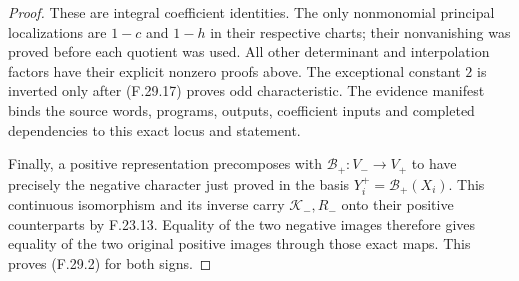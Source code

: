 \begin{proof}
These are integral coefficient identities.
The only nonmonomial principal localizations
are $1-c$ and $1-h$ in their respective
charts; their nonvanishing was proved before
each quotient was used. All other determinant
and interpolation factors have their explicit
nonzero proofs above. The exceptional constant
$2$ is inverted only after (F.29.17) proves
odd characteristic. The evidence manifest
binds the source words, programs, outputs,
coefficient inputs and completed dependencies
to this exact locus and statement.

Finally, a positive representation precomposes
with $\mathcal B_+:V_-\to V_+$ to have precisely
the negative character just proved in the
basis $Y_i^+=\mathcal B_+(X_i)$.
This continuous isomorphism and its inverse
carry $\mathcal K_-,R_-$ onto their positive
counterparts by F.23.13. Equality of the two
negative images therefore gives equality of
the two original positive images through
those exact maps. This proves (F.29.2) for
both signs.
\end{proof}
